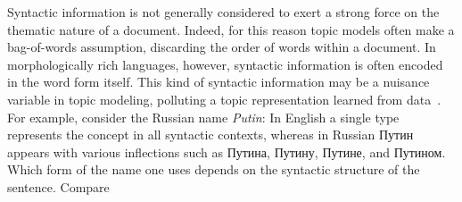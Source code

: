 \documentclass[11pt,letterpaper]{article}
\begin{document}
Syntactic information is not generally considered to exert a strong
force on the thematic nature of a document.  Indeed, for this reason
topic models often make a bag-of-words assumption, discarding the order
of words within a document.  In morphologically rich languages,
however, syntactic information is often encoded in the word form
itself.  This kind of syntactic information may be a nuisance variable
in topic modeling, polluting a topic representation
learned from data~\cite{boydgraber2014}.
For example, consider the Russian name
{\em Putin}: In English a single type represents the
concept in all syntactic contexts, whereas in Russian
{ Путин} appears with various inflections
such as {Путина},
{Путину}, {Путине},
and {Путином}. Which form of the name one uses
depends on the syntactic structure of the sentence. Compare
\end{document}
